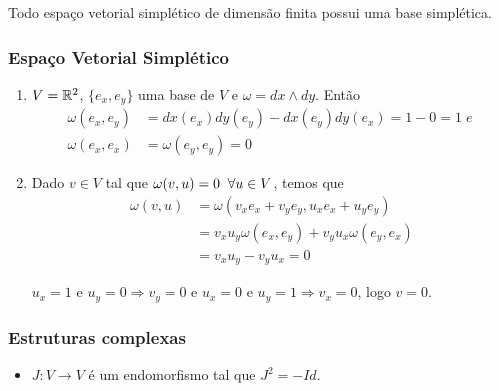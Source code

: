 \documentclass{beamer}
\begin{document}
\begin{footnotesize}
\begin{frame}
			\begin{teorema}
				Todo espaço vetorial simplético de dimensão finita possui uma base simplética.
			\end{teorema}
	
	\end{frame}
	

	
	\begin{frame}
		\frametitle{Espaço Vetorial Simplético}
	\begin{exemplo}
			\begin{enumerate}
				\item $V = \mathbb{R}^{2}$, $\{e_{x}, e_{y}\}$ uma base de $V$ e $\omega=dx \wedge dy$. Então 
				$$
				\begin{aligned}
					\omega(e_{x}, e_{y}) &=dx(e_{x}) dy(e_{y}) - dx(e_{y}) dy(e_{x}) = 1-0= 1 \; e\; 
					\\
					\omega(e_{x}, e_{x}) &= \omega(e_{y}, e_{y}) = 0	
				\end{aligned}
				$$ 
				
				\item Dado $v \in V$ tal que $\omega(v, u)=0 \;\;\forall u \in V$, temos que 
				$$
				\begin{aligned}
					\omega(v, u) &= \omega(v_{x}e_{x}+v_{y}e_{y}, u_{x}e_{x}+u_{y}e_{y})
					\\
					&=
					v_{x}u_{y}\omega(e_{x}, e_{y}) +v_{y}u_{x}\omega(e_{y}, e_{x})
					\\
					&= v_{x}u_{y} -v_{y}u_{x} = 0
				\end{aligned}
				$$
				
				$u_{x} = 1$ e $u_{y} = 0 \Rightarrow v_{y} = 0$ e $u_{x} = 0$ e $u_{y} = 1 \Rightarrow v_{x} = 0$, logo $v=0$.
				
			\end{enumerate}			
		\end{exemplo}
	\end{frame}
	
	\begin{frame}
		\frametitle{Estruturas complexas}
		
		\begin{definicao}
			\begin{itemize}
				\item $J: V \to V$ é um endomorfismo tal que $J^{2} = -Id$. 
				

\end{itemize}
\end{definicao}
\end{frame}
\end{footnotesize}
\end{document}
